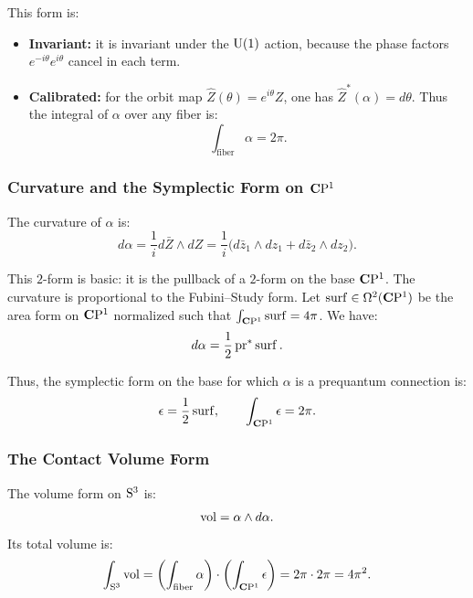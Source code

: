 \documentclass[11pt,reqno,letterpaper,twoside]{amsart}
\newcommand{\barZ}{\bar Z}
\newcommand{\CPOne}{{\fieldC\mathrm{P}^1}}
\begin{document}
  This form is:
  \begin{itemize}[nosep]
    \item \textbf{Invariant:}
    it is invariant under the $\mathrm{U}(1)$ action,
    because the phase factors $e^{-i\theta}e^{i\theta}$ cancel in each term.
    \item \textbf{Calibrated:}
    for the orbit map $\hat{Z}(\theta) = e^{i\theta} Z$,
    one has $\hat{Z}^*(\alpha) = d\theta$.
    Thus the integral of $\alpha$ over any fiber is:
    \[
      \int_{\text{fiber}} \alpha = 2\pi.
      \]
  \end{itemize}
  
  \subsubsection{Curvature and the Symplectic Form on $\CPOne$}
  
  The curvature of $\alpha$ is:
  \[
    d\alpha = \frac{1}{i} d\barZ \wedge dZ
    = \frac{1}{i} \bigl( d\bar{z}_1 \wedge dz_1 + d\bar{z}_2 \wedge dz_2 \bigr).
    \]
  
  This $2$-form is basic:
  it is the pullback of a $2$-form on the base $\CPOne$.
  The curvature is proportional to the Fubini--Study form.
  Let $\operatorname{surf} \in \Omega^2({\mathbf{C}}\mathrm{P}^1)$ be the area form on $\CPOne$
  normalized such that $\int_{{\mathbf{C}}\mathrm{P}^1} \operatorname{surf} = 4\pi$.
  We have:
  \[
    d\alpha = \frac{1}{2} \pr^*\Surf.
    \]
  
  Thus,
  the symplectic form on the base for which $\alpha$ is a prequantum connection is:
  \[
    \epsilon = \frac{1}{2} \operatorname{surf},
    \qquad \int_{{\mathbf{C}}\mathrm{P}^1} \epsilon = 2\pi.
    \]
  
  \subsubsection{The Contact Volume Form}
  
  The volume form on $\mathrm{S}^3$ is:
  \[
    \mathrm{vol} = \alpha \wedge d\alpha.
    \]
  Its total volume is:
  \[
    \int_{\mathrm{S}^3} \mathrm{vol}
    = \left( \int_{\text{fiber}} \alpha \right) \cdot \left( \int_{{\mathbf{C}}\mathrm{P}^1} \epsilon \right)
    = 2\pi \cdot 2\pi
    = 4\pi^2.
    \]
  
\end{document}
